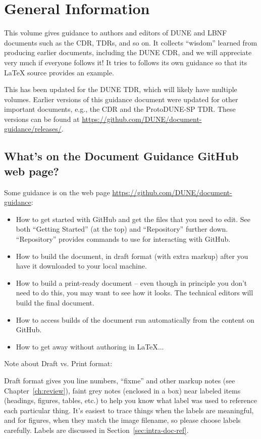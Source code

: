 \chapter{General Information}
\label{ch:generalities}

This volume gives guidance to authors and editors of DUNE and LBNF documents such as the CDR, TDRs, and so on. It collects ``wisdom'' learned from 
producing earlier documents, including the DUNE CDR, and we will appreciate 
very much if everyone follows it!  It tries to follows its own guidance so that its \LaTeX{} source
provides an example.  

This has been updated for the DUNE TDR, which will likely have multiple volumes. Earlier versions of this guidance document were updated for other important documents, e.g., the CDR and the ProtoDUNE-SP TDR.  These versions can be found at \url{https://github.com/DUNE/document-guidance/releases/}.


\section{What's on the Document Guidance GitHub web page?}
\label{ssec:files-webpage}

Some guidance is on the web page \url{https://github.com/DUNE/document-guidance}:

\begin{itemize}
\item How to get started with GitHub and get the files that you need to edit. See both ``Getting Started'' (at the top) and ``Repository'' further down.  ``Repository'' provides commands to use for interacting with GitHub.
\item How to build the document, in draft format (with extra markup) after you have it downloaded to your local machine.
\item How to build a print-ready document -- even though in principle you don't need to do this, you may want to see how it looks. The technical editors will build the final document.
\item How to access builds of the document run automatically from the content on GitHub.
\item How to get away without authoring in \LaTeX{}...
\end{itemize}

Note about Draft vs. Print format: 

Draft format gives you line numbers, ``fixme'' and other markup notes (see Chapter~\ref{ch:review}), 
faint grey notes (enclosed in a box) near labeled items (headings, figures, tables, etc.) to help you know 
what label was used to reference each particular thing.  
It's easiest to trace things when the labels are meaningful, and for figures, when they match the image filename, so please choose labels carefully. Labels are discussed in Section~\ref{sec:intra-doc-ref}.


